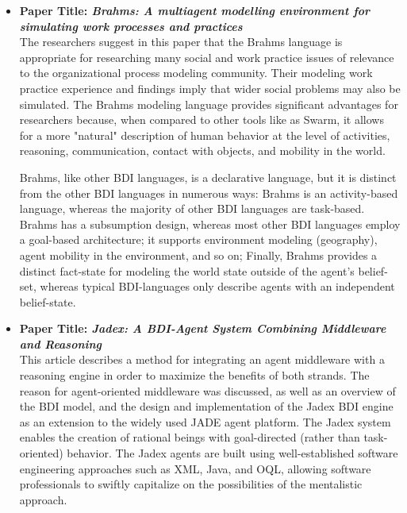 \begin{itemize}[label={}]
\vspace{.5cm}

\item \textbf{Paper Title: \textit{Brahms: A multiagent modelling environment for simulating work processes and practices}}\\

The researchers suggest in this paper \cite{brahms} that the Brahms language is appropriate for researching many social and work practice issues of relevance to the organizational process modeling community. Their modeling work practice experience and findings imply that wider social problems may also be simulated. The Brahms modeling language provides significant advantages for researchers because, when compared to other tools like as Swarm, it allows for a more "natural" description of human behavior at the level of activities, reasoning, communication, contact with objects, and mobility in the world.

\vspace{.5cm}

Brahms, like other \ac{BDI} languages, is a declarative language, but it is distinct from the other \ac{BDI} languages in numerous ways:
Brahms is an activity-based language, whereas the majority of other \ac{BDI} languages are task-based. Brahms has a subsumption design, whereas most other \ac{BDI} languages employ a goal-based architecture; it supports environment modeling (geography), agent mobility in the environment, and so on; Finally, Brahms provides a distinct fact-state for modeling the world state outside of the agent's belief-set, whereas typical \ac{BDI}-languages only describe agents with an independent belief-state.

\vspace{.5cm}

\item \textbf{Paper Title: \textit{Jadex: A \ac{BDI}-Agent System Combining Middleware and Reasoning}}\\

This article \cite{jadex} describes a method for integrating an agent middleware with a reasoning engine in order to maximize the benefits of both strands. The reason for agent-oriented middleware was discussed, as well as an overview of the \ac{BDI} model, and the design and implementation of the Jadex \ac{BDI} engine as an extension to the widely used JADE agent platform. The Jadex system enables the creation of rational beings with goal-directed (rather than task-oriented) behavior. The Jadex agents are built using well-established software engineering approaches such as XML, Java, and OQL, allowing software professionals to swiftly capitalize on the possibilities of the mentalistic approach.


\end{itemize}
